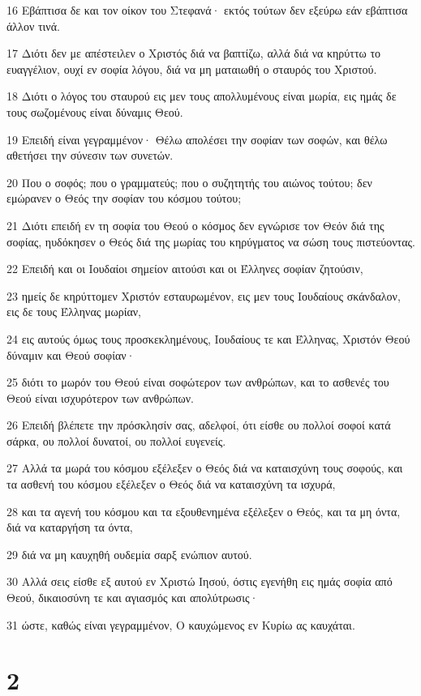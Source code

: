 \par 16 Εβάπτισα δε και τον οίκον του Στεφανά· εκτός τούτων δεν εξεύρω εάν εβάπτισα άλλον τινά.
\par 17 Διότι δεν με απέστειλεν ο Χριστός διά να βαπτίζω, αλλά διά να κηρύττω το ευαγγέλιον, ουχί εν σοφία λόγου, διά να μη ματαιωθή ο σταυρός του Χριστού.
\par 18 Διότι ο λόγος του σταυρού εις μεν τους απολλυμένους είναι μωρία, εις ημάς δε τους σωζομένους είναι δύναμις Θεού.
\par 19 Επειδή είναι γεγραμμένον· Θέλω απολέσει την σοφίαν των σοφών, και θέλω αθετήσει την σύνεσιν των συνετών.
\par 20 Που ο σοφός; που ο γραμματεύς; που ο συζητητής του αιώνος τούτου; δεν εμώρανεν ο Θεός την σοφίαν του κόσμου τούτου;
\par 21 Διότι επειδή εν τη σοφία του Θεού ο κόσμος δεν εγνώρισε τον Θεόν διά της σοφίας, ηυδόκησεν ο Θεός διά της μωρίας του κηρύγματος να σώση τους πιστεύοντας.
\par 22 Επειδή και οι Ιουδαίοι σημείον αιτούσι και οι Έλληνες σοφίαν ζητούσιν,
\par 23 ημείς δε κηρύττομεν Χριστόν εσταυρωμένον, εις μεν τους Ιουδαίους σκάνδαλον, εις δε τους Έλληνας μωρίαν,
\par 24 εις αυτούς όμως τους προσκεκλημένους, Ιουδαίους τε και Έλληνας, Χριστόν Θεού δύναμιν και Θεού σοφίαν·
\par 25 διότι το μωρόν του Θεού είναι σοφώτερον των ανθρώπων, και το ασθενές του Θεού είναι ισχυρότερον των ανθρώπων.
\par 26 Επειδή βλέπετε την πρόσκλησίν σας, αδελφοί, ότι είσθε ου πολλοί σοφοί κατά σάρκα, ου πολλοί δυνατοί, ου πολλοί ευγενείς.
\par 27 Αλλά τα μωρά του κόσμου εξέλεξεν ο Θεός διά να καταισχύνη τους σοφούς, και τα ασθενή του κόσμου εξέλεξεν ο Θεός διά να καταισχύνη τα ισχυρά,
\par 28 και τα αγενή του κόσμου και τα εξουθενημένα εξέλεξεν ο Θεός, και τα μη όντα, διά να καταργήση τα όντα,
\par 29 διά να μη καυχηθή ουδεμία σαρξ ενώπιον αυτού.
\par 30 Αλλά σεις είσθε εξ αυτού εν Χριστώ Ιησού, όστις εγενήθη εις ημάς σοφία από Θεού, δικαιοσύνη τε και αγιασμός και απολύτρωσις·
\par 31 ώστε, καθώς είναι γεγραμμένον, Ο καυχώμενος εν Κυρίω ας καυχάται.

\chapter{2}

